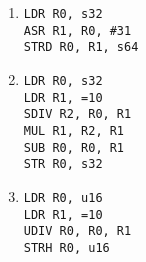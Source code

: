 \documentclass{article}
\begin{document}
\begin{enumerate}
\begin{multicols}{2}
\begin{enumerate}
            \item
                \texttt{LDR R0, s32}  \\
                \texttt{ASR R1, R0, \#31}  \\
                \texttt{STRD R0, R1, s64}   \\

            \item
                \texttt{LDR R0, s32}  \\
                \texttt{LDR R1, =10}  \\
                \texttt{SDIV R2, R0, R1}  \\
                \texttt{MUL R1, R2, R1}  \\
                \texttt{SUB R0, R0, R1}  \\
                \texttt{STR R0, s32}   \\

            \item
                \texttt{LDR R0, u16}  \\
                \texttt{LDR R1, =10}  \\
                \texttt{UDIV R0, R0, R1}  \\
                \texttt{STRH R0, u16}   \\
        \end{enumerate}
        \end{multicols}
\end{enumerate}
\end{document}
